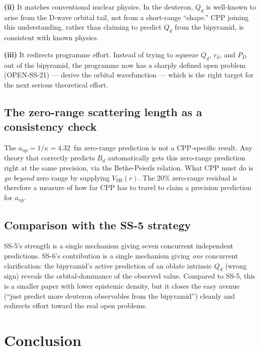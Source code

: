 \documentclass[11pt,letterpaper]{article}
\newcommand{\Bd}{B_{d}}
\newcommand{\Qd}{Q_{d}}
\newcommand{\PD}{P_{D}}
\newcommand{\anp}{a_{np}}
\newcommand{\VSR}{V_{\mathrm{SR}}}
\begin{document}
\textbf{(ii)} It matches conventional nuclear physics. In the deuteron, $\Qd$ is well-known to arise from the D-wave orbital tail, not from a short-range ``shape.'' CPP joining this understanding, rather than claiming to predict $\Qd$ from the bipyramid, is consistent with known physics.

\textbf{(iii)} It redirects programme effort. Instead of trying to squeeze $\Qd$, $r_d$, and $\PD$ out of the bipyramid, the programme now has a sharply defined open problem (OPEN-SS-21) --- derive the orbital wavefunction --- which is the right target for the next serious theoretical effort.

\subsection{The zero-range scattering length as a consistency check}

The $\anp = 1/\kappa = 4.32$~fm zero-range prediction is not a CPP-specific result. Any theory that correctly predicts $\Bd$ automatically gets this zero-range prediction right at the same precision, via the Bethe-Peierls relation. What CPP must do is \emph{go beyond} zero range by supplying $\VSR(r)$. The $20\%$ zero-range residual is therefore a measure of how far CPP has to travel to claim a precision prediction for $\anp$.

\subsection{Comparison with the SS-5 strategy}

SS-5's strength is a single mechanism giving seven concurrent independent predictions. SS-6's contribution is a single mechanism giving \emph{one} concurrent clarification: the bipyramid's active prediction of an oblate intrinsic $\Qd$ (wrong sign) reveals the orbital-dominance of the observed value. Compared to SS-5, this is a smaller paper with lower epistemic density, but it closes the easy avenue (``just predict more deuteron observables from the bipyramid'') cleanly and redirects effort toward the real open problems.

\section{Conclusion}
\label{sec:conclusion}
\end{document}
